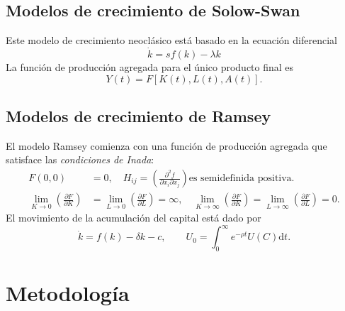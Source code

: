 \documentclass{sciposter}
\begin{document}
\begin{multicols*}{2}
\subsection*{Modelos de crecimiento de Solow-Swan}
Este modelo de crecimiento neoclásico está basado en la ecuación diferencial
\begin{equation}\label{eq:solowgrowth}
\dot{k}=sf\left(k\right)-\lambda k
\end{equation}
La función de producción agregada para el único producto final es
\begin{equation}\label{eq:aggregate}
	Y\left(t\right)=F\left[K\left(t\right),L\left(t\right),A\left(t\right)\right].
\end{equation}
\subsection*{Modelos de crecimiento de Ramsey}
El modelo Ramsey comienza con una función de producción agregada que satisface las \emph{condiciones de Inada}:
\begin{align*}
F\left(0,0\right)
&=0,\quad
H_{ij}=\left(\frac{\partial^{2}f}{\partial x_{i}\partial x_{j}}\right) \text{es semidefinida positiva}.\\
\lim\limits_{K\to0}\left(\frac{\partial F}{\partial K}\right)
&=\lim\limits_{L\to0}\left(\frac{\partial F}{\partial L}\right)=\infty,\quad
\lim\limits_{K\to\infty}\left(\frac{\partial F}{\partial K}\right)
=\lim\limits_{L\to\infty}\left(\frac{\partial F}{\partial L}\right)=0.
\end{align*}
El movimiento de la acumulación del capital está dado por
\begin{equation}
\dot{k}=f\left(k\right)-\delta k-c,\qquad
U_{0}=\int_{0}^{\infty}e^{-\rho t}U\left(C\right)\mathrm{d}t.
\end{equation}
\section{Metodología}

\end{multicols*}
\end{document}
